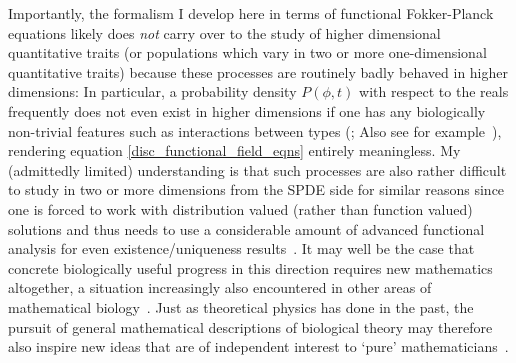 Importantly, the formalism I develop here in terms of functional Fokker-Planck equations likely does \emph{not} carry over to the study of higher dimensional quantitative traits (or populations which vary in two or more one-dimensional quantitative traits) because these processes are routinely badly behaved in higher dimensions: In particular, a probability density $P(\phi,t)$ with respect to the reals frequently does not even exist in higher dimensions if one has any biologically non-trivial features such as interactions between types (\cite{fleming_measure-valued_1979, walsh_introduction_1986}; Also see for example~\cite{evans_measure-valued_1994}), rendering equation \eqref{disc_functional_field_eqns} entirely meaningless. My (admittedly limited) understanding is that such processes are also rather difficult to study in two or more dimensions from the SPDE side for similar reasons since one is forced to work with distribution valued (rather than function valued) solutions and thus needs to use a considerable amount of advanced functional analysis for even existence/uniqueness results~\citep{walsh_introduction_1986,carmona_stochastic_1999,prevot_concise_2007,liu_stochastic_2015,balan_gentle_2018}. It may well be the case that concrete biologically useful progress in this direction requires new mathematics altogether, a situation increasingly also encountered in other areas of mathematical biology~\citep{vittadello_open_2022}. Just as theoretical physics has done in the past, the pursuit of general mathematical descriptions of biological theory may therefore also inspire new ideas that are of independent interest to `pure' mathematicians~\citep{cohen_mathematics_2004}.
